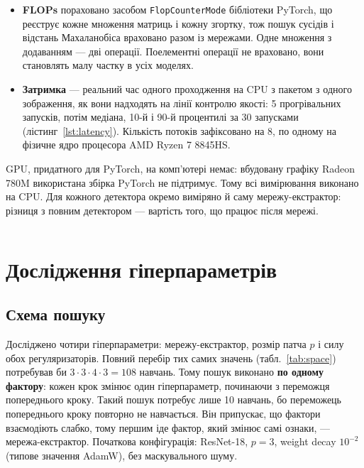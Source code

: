 \documentclass[14pt,a4paper]{extreport}
\begin{document}
\begin{itemize}
\item \textbf{FLOPs} пораховано засобом \texttt{FlopCounterMode} бібліотеки PyTorch, що реєструє кожне множення матриць і кожну згортку, тож пошук сусідів і відстань Махаланобіса враховано разом із мережами. Одне множення з додаванням --- дві операції. Поелементні операції не враховано, вони становлять малу частку в усіх моделях.
\item \textbf{Затримка} --- реальний час одного проходження на CPU з пакетом з одного зображення, як вони надходять на лінії контролю якості: 5 прогрівальних запусків, потім медіана, 10-й і 90-й процентилі за 30 запусками (лістинг~\ref{lst:latency}). Кількість потоків зафіксовано на 8, по одному на фізичне ядро процесора AMD Ryzen 7 8845HS.
\end{itemize}

GPU, придатного для PyTorch, на комп'ютері немає: вбудовану графіку Radeon 780M використана збірка PyTorch не підтримує. Тому всі вимірювання виконано на CPU. Для кожного детектора окремо виміряно й саму мережу-екстрактор: різниця з повним детектором --- вартість того, що працює після мережі.

\inputminted[firstline=103,lastline=121]{python}{../src/mk1/profiling.py}
\label{lst:latency}

\section{Дослідження гіперпараметрів}
\label{sec:search}

\subsection{Схема пошуку}

Досліджено чотири гіперпараметри: мережу-екстрактор, розмір патча $p$ і силу обох регуляризаторів. Повний перебір тих самих значень (табл.~\ref{tab:space}) потребував би $3 \cdot 3 \cdot 4 \cdot 3 = 108$ навчань. Тому пошук виконано \textbf{по одному фактору}: кожен крок змінює один гіперпараметр, починаючи з переможця попереднього кроку. Такий пошук потребує лише 10 навчань, бо переможець попереднього кроку повторно не навчається. Він припускає, що фактори взаємодіють слабко, тому першим іде фактор, який змінює самі ознаки, --- мережа-екстрактор. Початкова конфігурація: ResNet-18, $p = 3$, weight decay $10^{-2}$ (типове значення AdamW), без маскувального шуму.
\end{document}
